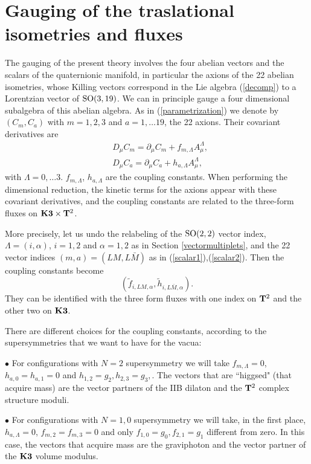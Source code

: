 \documentclass[a4paper,12pt]{article}
\begin{document}
\section{\label{gaugingtraslational}Gauging of the traslational isometries and fluxes}

The gauging of the present theory  involves the four abelian
vectors and the scalars of the quaternionic manifold, in
particular the axions of the 22 abelian isometries, whose Killing
vectors correspond in the Lie algebra (\ref{decomp}) to a
Lorentzian vector of $\mathrm{SO}(3,19)$. We can in principle gauge a
four dimensional subalgebra of this abelian algebra. As in
(\ref{parametrization}) we denote by $(C_m, C_a)$ with $m=1,2,3$
and $a=1,\dots 19$, the 22 axions. Their covariant derivatives are
\begin{eqnarray*} &D_\mu C_m=\partial_\mu
C_m+f_{m,\Lambda}A^{\Lambda}_\mu,\\&D_\mu C_a=\partial_\mu
C_a+h_{a,\Lambda}A^{\Lambda}_\mu,\end{eqnarray*} with
$\Lambda=0,\dots 3$.  $f_{m,\Lambda}$, $h_{a,\Lambda}$ are the
coupling constants. When performing the dimensional reduction, the
kinetic terms for the axions appear with these covariant
derivatives, and the coupling constants are related to the
three-form fluxes on $\mathbf{K3}\times \mathbf{T}^2$.

More precisely, let us undo the relabeling of the $\mathrm{SO}(2,2)$
vector index, $\Lambda =(i,\alpha)$, $i=1,2$ and $\alpha =1,2$ as
in Section \ref{vectormultiplets}, and the 22 vector indices
$(m,a)= (LM,L\bar M)$ as in (\ref{scalar1}),(\ref{scalar2}). Then
the coupling constants become
$$(\tilde f_{i,LM,\alpha},\tilde h_{i,L\bar M,\alpha}).$$
They can be identified with the three form fluxes with one index
on $\mathbf{T}^2$ and the other two on $\mathbf{K3}$.

There are different choices for the coupling constants, according
to the supersymmetries that we want to have for the vacua:

\smallskip

\noindent $\bullet$ For configurations with $N=2$ supersymmetry we
will take $f_{m,\Lambda}=0$,  $h_{a,0}=h_{a,1}=0$ and
$h_{1,2}=g_2, h_{2,3}=g_3,$. The vectors that are ``higgsed" (that
acquire mass) are the vector partners of the IIB dilaton and the
$\mathbf{T}^2$ complex structure moduli.

\smallskip

\noindent $\bullet$ For configurations with $N=1,0$ supersymmetry
we will take, in the first place, $h_{a,\Lambda}=0$,
$f_{m,2}=f_{m,3}=0$ and only $f_{1,0}=g_0, f_{2,1}=g_1$ different
from zero.  In this case, the vectors that acquire mass are the
graviphoton and the vector partner of the $\mathbf{K3}$ volume modulus.
\end{document}
